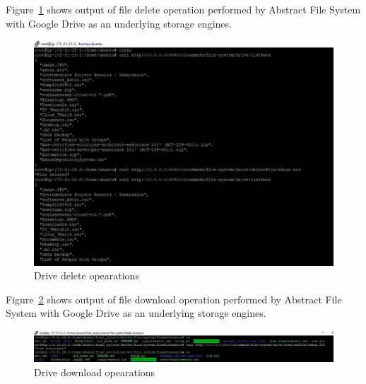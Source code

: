Figure~\ref{fig:drive-delete} shows output of file delete operation performed 
by Abstract File System with Google Drive as an underlying storage engines. 

\begin{figure}[!ht]
        \centering\includegraphics[width=\columnwidth]
        {image/drive-delete.JPG}
        \caption{Drive delete opearations}\label{fig:drive-delete}
\end{figure}


Figure~\ref{fig:drive-download} 
shows output of file download operation performed 
by Abstract File System with Google Drive as an underlying storage engines. 

\begin{figure}[!ht]
        \centering\includegraphics[width=\columnwidth]
        {image/drive-download.JPG}
        \caption{Drive download opearations}\label{fig:drive-download}
\end{figure}


